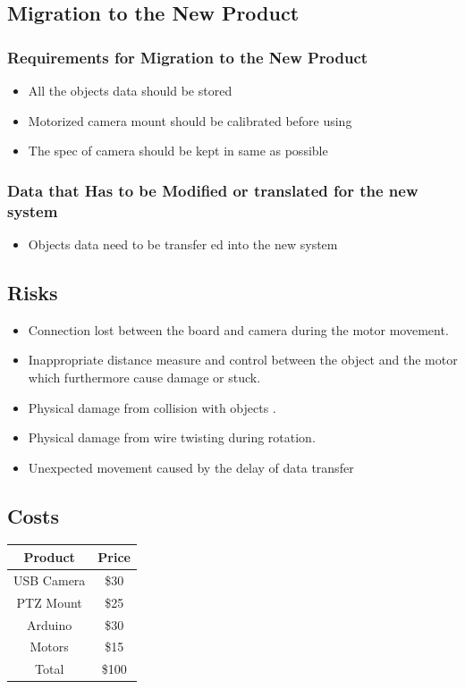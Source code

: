 \documentclass[12pt]{article}
\begin{document}
\subsection{Migration to the New Product}
    \subsubsection{Requirements for Migration to the New Product}
        \begin{itemize}
            \item All the objects data should be stored 
            \item Motorized camera mount should be calibrated before using
            \item The spec of camera should be kept in same as possible
        \end{itemize}
    \subsubsection{Data that Has to be Modified or translated for the new system}
        \begin{itemize}
            \item Objects data need to be transfer ed into the new system
        \end{itemize}

\subsection{Risks}
\begin{itemize}
    \item Connection lost between the board and camera during the motor movement.
    \item Inappropriate distance measure and control between the object and the motor which furthermore cause damage or stuck.
    \item Physical damage from collision with objects .
    \item Physical damage from wire twisting during rotation.
    \item Unexpected movement caused by the delay of data transfer
\end{itemize}
\subsection{Costs}
\begin{large}
\begin{center}
    \begin{tabular}{|| c || c ||}
    \hline
    Product & Price\\
    \hline\hline
    USB Camera & \$30\\
    \hline
    PTZ Mount & \$25\\
    \hline
    Arduino & \$30\\
    \hline
    Motors & \$15\\
    \hline
    Total & \$100\\
    \hline
    \end{tabular}
\end{center}
\end{large}
\end{document}
